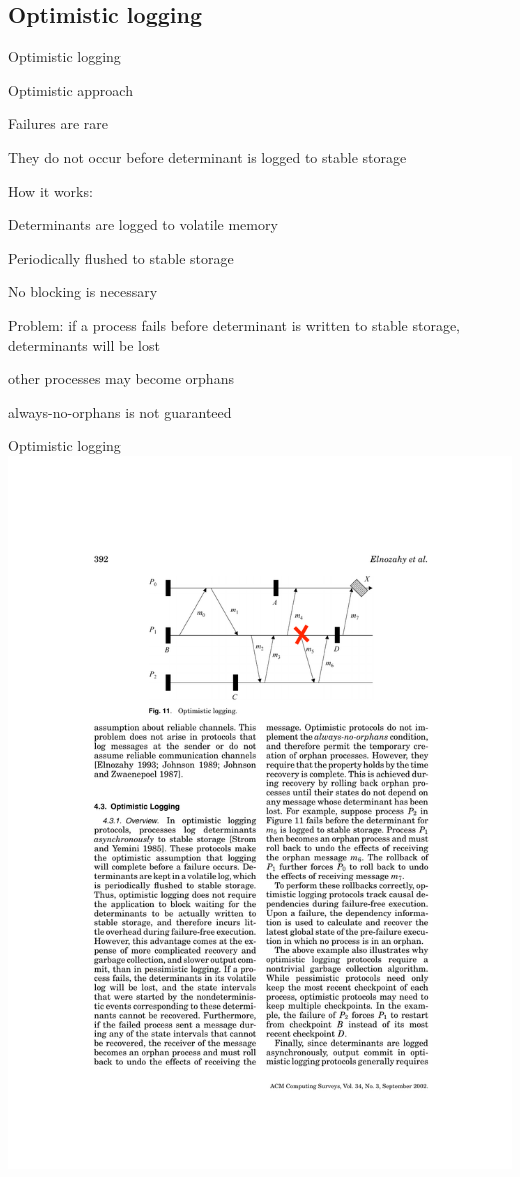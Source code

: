 \subsection{Optimistic logging}

\begin{frame}{Optimistic logging}
	
\begin{block}{Optimistic approach}
\BI
\item Failures are rare
\item They do not occur before determinant is logged to stable storage
\EI
\end{block}

\medskip
\BIL
\item How it works:
	\BI
	\item Determinants are logged to volatile memory
	\item Periodically flushed to stable storage
	\item No blocking is necessary
	\EI
\item Problem: if a process fails before determinant is written to stable storage,
determinants will be lost
	\BI
	\item other processes may become orphans
	\item always-no-orphans is not guaranteed
	\EI
\EIL

\end{frame}

\begin{frame}{Optimistic logging}
\includegraphics[width=\textwidth]{optimistic}
\end{frame}

